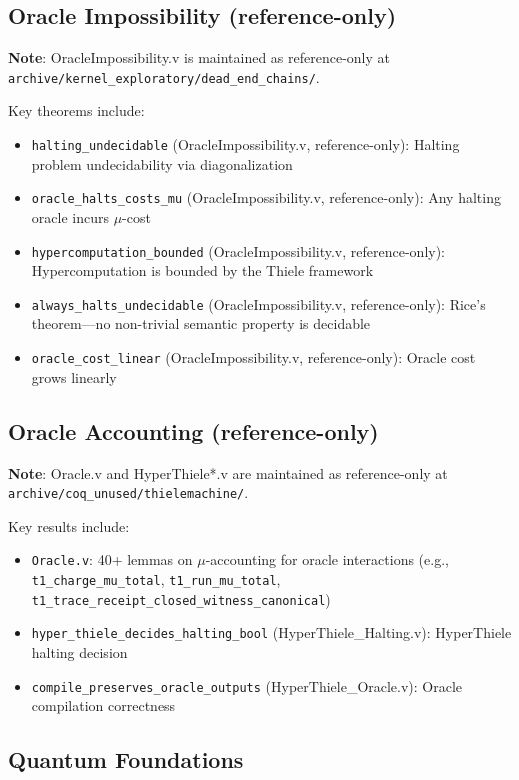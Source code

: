 \subsection{Oracle Impossibility (reference-only)}

\textbf{Note}: OracleImpossibility.v is maintained as reference-only at \texttt{archive/kernel\_exploratory/dead\_end\_chains/}.

Key theorems include:
\begin{itemize}
    \item \texttt{halting\_undecidable} (OracleImpossibility.v, reference-only): Halting problem undecidability via diagonalization
    \item \texttt{oracle\_halts\_costs\_mu} (OracleImpossibility.v, reference-only): Any halting oracle incurs $\mu$-cost
    \item \texttt{hypercomputation\_bounded} (OracleImpossibility.v, reference-only): Hypercomputation is bounded by the Thiele framework
    \item \texttt{always\_halts\_undecidable} (OracleImpossibility.v, reference-only): Rice's theorem---no non-trivial semantic property is decidable
    \item \texttt{oracle\_cost\_linear} (OracleImpossibility.v, reference-only): Oracle cost grows linearly
\end{itemize}

\subsection{Oracle Accounting (reference-only)}

\textbf{Note}: Oracle.v and HyperThiele*.v are maintained as reference-only at \texttt{archive/coq\_unused/thielemachine/}.

Key results include:
\begin{itemize}
    \item \texttt{Oracle.v}: 40+ lemmas on $\mu$-accounting for oracle interactions (e.g., \texttt{t1\_charge\_mu\_total}, \texttt{t1\_run\_mu\_total}, \texttt{t1\_trace\_receipt\_closed\_witness\_canonical})
    \item \texttt{hyper\_thiele\_decides\_halting\_bool} (HyperThiele\_Halting.v): HyperThiele halting decision
    \item \texttt{compile\_preserves\_oracle\_outputs} (HyperThiele\_Oracle.v): Oracle compilation correctness
\end{itemize}

\subsection{Quantum Foundations}

